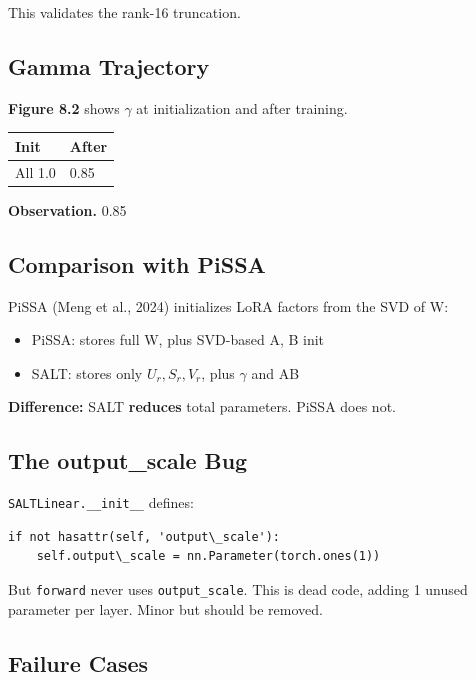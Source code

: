 This validates the rank-16 truncation.

\subsection{Gamma Trajectory}

\textbf{Figure 8.2} shows $\gamma$ at initialization and after training.

\begin{table}[H]
\centering
\small
\begin{tabular}{ll}
\toprule
\textbf{Init} & \textbf{After} \\
\midrule
All 1.0 & 0.85 \\
\bottomrule
\end{tabular}
\end{table}

\textbf{Observation.} 0.85

\subsection{Comparison with PiSSA}

PiSSA (Meng et al., 2024) initializes LoRA factors from the SVD of W:

\begin{itemize}
\item PiSSA: stores full W, plus SVD-based A, B init
\item SALT: stores only $U_r, S_r, V_r$, plus $\gamma$ and AB

\end{itemize}
\textbf{Difference:} SALT \textbf{reduces} total parameters. PiSSA does not.

\subsection{The output\_scale Bug}

\texttt{SALTLinear.\_\_init\_\_} defines:

\begin{lstlisting}
if not hasattr(self, 'output\_scale'):
    self.output\_scale = nn.Parameter(torch.ones(1))
\end{lstlisting}

But \texttt{forward} never uses \texttt{output\_scale}. This is dead code, adding 1 unused 
parameter per layer. Minor but should be removed.

\subsection{Failure Cases}

